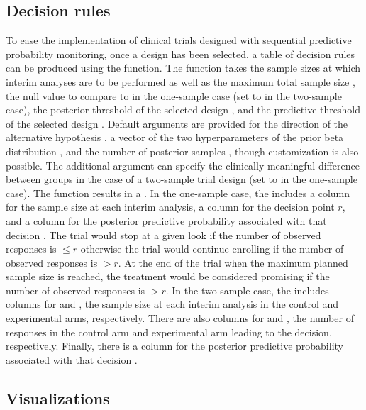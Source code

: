 \hypertarget{decision-rules}{%
\subsection{Decision rules}\label{decision-rules}}

To ease the implementation of clinical trials designed with sequential
predictive probability monitoring, once a design has been selected, a
table of decision rules can be produced using the
 function. The function takes the sample
sizes  at which interim analyses are to be performed as well as
the maximum total sample size , the null value to compare to in
the one-sample case  (set to  in the two-sample
case), the posterior threshold of the selected design , and
the predictive threshold of the selected design . Default
arguments are provided for the direction of the alternative hypothesis
, a vector of the two hyperparameters of the prior beta
distribution , and the number of posterior samples ,
though customization is also possible. The additional argument
 can specify the clinically meaningful difference between
groups in the case of a two-sample trial design (set to  in
the one-sample case). The function results in a . In the
one-sample case, the  includes a column for the sample size
 at each interim analysis, a column for the decision point
\(r\), and a column for the posterior predictive probability associated
with that decision . The trial would stop at a given look if
the number of observed responses is \(\leq r\) otherwise the trial would
continue enrolling if the number of observed responses is \(>r\). At the
end of the trial when the maximum planned sample size is reached, the
treatment would be considered promising if the number of observed
responses is \(>r\). In the two-sample case, the  includes
columns for  and , the sample size at each interim
analysis in the control and experimental arms, respectively. There are
also columns for  and , the number of responses in the
control arm and experimental arm leading to the decision, respectively.
Finally, there is a column for the posterior predictive probability
associated with that decision .

\hypertarget{visualizations}{%
\subsection{Visualizations}\label{visualizations}}

